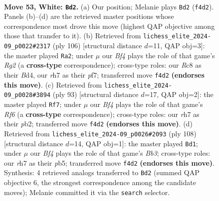 \documentclass[11pt]{article}
\begin{document}
\clearpage

\begin{figure}[p]\centering
\begin{subfigure}{0.46\textwidth}\centering
\resizebox{\linewidth}{!}{%
\newchessgame
\chessboard[
  setfen={2R5/7r/r5k1/1p6/3PKB2/1p6/8/8 w - - 0 53},
  showmover=false,
  pgfstyle=straightmove, color=movearrow, markmove={f4-d2}
]}
\caption{}
\end{subfigure}\hfill
\begin{subfigure}{0.46\textwidth}\centering
\resizebox{\linewidth}{!}{%
\newchessgame
\chessboard[
  setfen={8/5p1k/p7/4P3/3BK3/8/6R1/7r w - - 8 54},
  showmover=false,
  pgfstyle=straightmove, color=movearrow, markmove={g2-a2}
]}
\caption{}
\end{subfigure}
\\[4pt]
\begin{subfigure}{0.46\textwidth}\centering
\resizebox{\linewidth}{!}{%
\newchessgame
\chessboard[
  setfen={8/2pk4/7R/3pp3/8/5r2/1P6/1K4R1 b - - 3 47},
  showmover=false,
  pgfstyle=straightmove, color=movearrow, markmove={f3-f7}
]}
\caption{}
\end{subfigure}\hfill
\begin{subfigure}{0.46\textwidth}\centering
\resizebox{\linewidth}{!}{%
\newchessgame
\chessboard[
  setfen={8/p7/2rk4/1p6/3P4/1B1K4/8/8 w - - 0 55},
  showmover=false,
  pgfstyle=straightmove, color=movearrow, markmove={b3-d1}
]}
\caption{}
\end{subfigure}
\caption{\textbf{Move 53, White: \texttt{Bd2}.} (a) Our position; Melanie plays \texttt{Bd2} (\texttt{f4d2}). Panels (b)--(d) are the retrieved master positions whose correspondence most drove this move (highest QAP objective among those that transfer to it). (b) Retrieved from \texttt{lichess\_elite\_2024-09\_p0022\#2317} (ply 106) [structural distance $d$=11, QAP obj=3]: the master played \texttt{Ra2}; under $\mu$ our \emph{Bf4} plays the role of that game's \emph{Rg2} (a \textbf{cross-type} correspondence); cross-type roles: our \emph{R}c8 as their \emph{B}d4, our \emph{r}h7 as their \emph{p}f7; transferred move \texttt{f4d2} \textbf{(endorses this move)}. (c) Retrieved from \texttt{lichess\_elite\_2024-09\_p0028\#3894} (ply 93) [structural distance $d$=17, QAP obj=2]: the master played \texttt{Rf7}; under $\mu$ our \emph{Bf4} plays the role of that game's \emph{Rf6} (a \textbf{cross-type} correspondence); cross-type roles: our \emph{r}h7 as their \emph{p}b2; transferred move \texttt{f4d2} \textbf{(endorses this move)}. (d) Retrieved from \texttt{lichess\_elite\_2024-09\_p0026\#2093} (ply 108) [structural distance $d$=14, QAP obj=1]: the master played \texttt{Bd1}; under $\mu$ our \emph{Bf4} plays the role of that game's \emph{Bb3}; cross-type roles: our \emph{r}h7 as their \emph{p}b5; transferred move \texttt{f4d2} \textbf{(endorses this move)}. Synthesis: 4 retrieved analogs transferred to \texttt{Bd2} (summed QAP objective 6, the strongest correspondence among the candidate moves); Melanie committed it via the \texttt{search} selector.}
\label{fig:thought-m104}
\end{figure}
\end{document}
